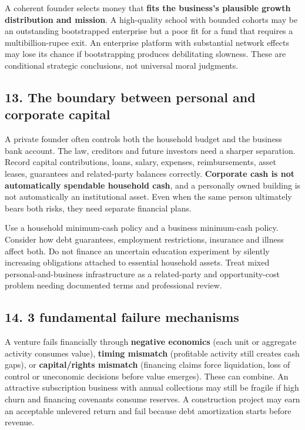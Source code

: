 A coherent founder selects money that \textbf{fits the business's plausible growth distribution and mission}. A high-quality school with bounded cohorts may be an outstanding bootstrapped enterprise but a poor fit for a fund that requires a multibillion-rupee exit. An enterprise platform with substantial network effects may lose its chance if bootstrapping produces debilitating slowness. These are conditional strategic conclusions, not universal moral judgments.

\subsection{13. The boundary between personal and corporate capital}


A private founder often controls both the household budget and the business bank account. The law, creditors and future investors need a sharper separation. Record capital contributions, loans, salary, expenses, reimbursements, asset leases, guarantees and related-party balances correctly. \textbf{Corporate cash is not automatically spendable household cash}, and a personally owned building is not automatically an institutional asset. Even when the same person ultimately bears both risks, they need separate financial plans.

Use a household minimum-cash policy and a business minimum-cash policy. Consider how debt guarantees, employment restrictions, insurance and illness affect both. Do not finance an uncertain education experiment by silently increasing obligations attached to essential household assets. Treat mixed personal-and-business infrastructure as a related-party and opportunity-cost problem needing documented terms and professional review.

\subsection{14. 3 fundamental failure mechanisms}


A venture fails financially through \textbf{negative economics} (each unit or aggregate activity consumes value), \textbf{timing mismatch} (profitable activity still creates cash gaps), or \textbf{capital/rights mismatch} (financing claims force liquidation, loss of control or uneconomic decisions before value emerges). These can combine. An attractive subscription business with annual collections may still be fragile if high churn and financing covenants consume reserves. A construction project may earn an acceptable unlevered return and fail because debt amortization starts before revenue.


